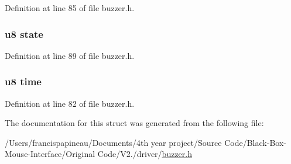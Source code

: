 \-Definition at line 85 of file buzzer.\-h.

\hypertarget{structbuzzer_ad0bc4e4e6e6ffc52d9079b73afd73887}{
\subsubsection[{state}]{\setlength{\rightskip}{0pt plus 5cm}u8 {\bf state}}}\label{structbuzzer_ad0bc4e4e6e6ffc52d9079b73afd73887}


\-Definition at line 89 of file buzzer.\-h.

\hypertarget{structbuzzer_a71f347517c3a3ac0fce4cab20925eb10}{
\subsubsection[{time}]{\setlength{\rightskip}{0pt plus 5cm}u8 {\bf time}}}\label{structbuzzer_a71f347517c3a3ac0fce4cab20925eb10}


\-Definition at line 82 of file buzzer.\-h.



\-The documentation for this struct was generated from the following file\-:\begin{DoxyCompactItemize}
\item 
/\-Users/francispapineau/\-Documents/4th year project/\-Source Code/\-Black-\/\-Box-\/\-Mouse-\/\-Interface/\-Original Code/\-V2./driver/\hyperlink{buzzer_8h}{buzzer.\-h}\end{DoxyCompactItemize}
